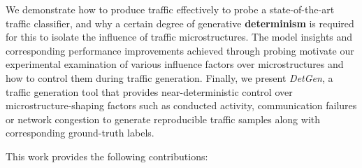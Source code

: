 We demonstrate how to produce traffic effectively to probe a state-of-the-art traffic classifier, and why a certain degree of generative \textbf{determinism} is required for this to isolate the influence of traffic microstructures. The model insights and corresponding performance improvements achieved through probing motivate our experimental examination of various influence factors over microstructures and how to control them during traffic generation. Finally, we present \emph{DetGen}, a traffic generation tool that provides near-deterministic control over microstructure-shaping factors such as conducted activity, communication failures or network congestion to generate reproducible traffic samples along with corresponding ground-truth labels. %




 
This work provides the following contributions:

